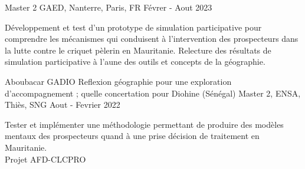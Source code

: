 \begin{cventries}
        {Master 2 GAED, Nanterre, Paris, FR} %
        {Févrer - Aout 2023} %
        {
        \begin{cvitems} %
          Développement et test d'un prototype de simulation participative pour comprendre les mécanismes qui conduisent à l'intervention des prospecteurs dans la lutte contre le criquet pèlerin en Mauritanie. Relecture des résultats de simulation participative à l'aune des outils et concepts de la géographie.
        \end{cvitems}
        }
    \cventry
        {Aboubacar GADIO} %
        {Reflexion géographie pour une exploration d'accompagnement ; quelle concertation pour Diohine (Sénégal)} %
        {Master 2, ENSA, Thiès, SNG} %
        {Aout - Fevrier 2022} %
        {
        \begin{cvitems} %
            Tester et implémenter une méthodologie permettant de produire des modèles mentaux des prospecteurs quand à une prise décision de traitement en Mauritanie.\\
            Projet AFD-CLCPRO
        \end{cvitems}
        }


\end{cventries}
